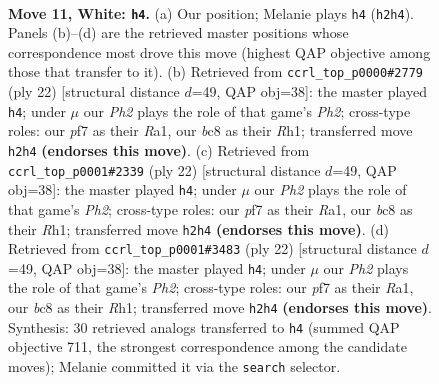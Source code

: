 \documentclass[11pt]{article}
\begin{document}
\clearpage

\begin{figure}[p]\centering
\begin{subfigure}{0.46\textwidth}\centering
\resizebox{\linewidth}{!}{%
\newchessgame
\chessboard[
  setfen={rnbqk2r/4bp2/2p2p2/pp1p3p/3P4/2N1P3/PP3PPP/R2QKBNR w KQkq - 0 11},
  showmover=false,
  pgfstyle=straightmove, color=movearrow, markmove={h2-h4}
]}
\caption{}
\end{subfigure}\hfill
\begin{subfigure}{0.46\textwidth}\centering
\resizebox{\linewidth}{!}{%
\newchessgame
\chessboard[
  setfen={r1bqk2r/5ppp/p1np4/1p1Np1b1/4P3/N1P5/PP3PPP/R2QKB1R w KQkq - 1 12},
  showmover=false,
  pgfstyle=straightmove, color=movearrow, markmove={h2-h4}
]}
\caption{}
\end{subfigure}
\\[4pt]
\begin{subfigure}{0.46\textwidth}\centering
\resizebox{\linewidth}{!}{%
\newchessgame
\chessboard[
  setfen={r1bqk2r/5ppp/p1np4/1p1Np1b1/4P3/N1P5/PP3PPP/R2QKB1R w KQkq - 1 12},
  showmover=false,
  pgfstyle=straightmove, color=movearrow, markmove={h2-h4}
]}
\caption{}
\end{subfigure}\hfill
\begin{subfigure}{0.46\textwidth}\centering
\resizebox{\linewidth}{!}{%
\newchessgame
\chessboard[
  setfen={r1bqk2r/5ppp/p1np4/1p1Np1b1/4P3/N1P5/PP3PPP/R2QKB1R w KQkq - 1 12},
  showmover=false,
  pgfstyle=straightmove, color=movearrow, markmove={h2-h4}
]}
\caption{}
\end{subfigure}
\caption{\textbf{Move 11, White: \texttt{h4}.} (a) Our position; Melanie plays \texttt{h4} (\texttt{h2h4}). Panels (b)--(d) are the retrieved master positions whose correspondence most drove this move (highest QAP objective among those that transfer to it). (b) Retrieved from \texttt{ccrl\_top\_p0000\#2779} (ply 22) [structural distance $d$=49, QAP obj=38]: the master played \texttt{h4}; under $\mu$ our \emph{Ph2} plays the role of that game's \emph{Ph2}; cross-type roles: our \emph{p}f7 as their \emph{R}a1, our \emph{b}c8 as their \emph{R}h1; transferred move \texttt{h2h4} \textbf{(endorses this move)}. (c) Retrieved from \texttt{ccrl\_top\_p0001\#2339} (ply 22) [structural distance $d$=49, QAP obj=38]: the master played \texttt{h4}; under $\mu$ our \emph{Ph2} plays the role of that game's \emph{Ph2}; cross-type roles: our \emph{p}f7 as their \emph{R}a1, our \emph{b}c8 as their \emph{R}h1; transferred move \texttt{h2h4} \textbf{(endorses this move)}. (d) Retrieved from \texttt{ccrl\_top\_p0001\#3483} (ply 22) [structural distance $d$=49, QAP obj=38]: the master played \texttt{h4}; under $\mu$ our \emph{Ph2} plays the role of that game's \emph{Ph2}; cross-type roles: our \emph{p}f7 as their \emph{R}a1, our \emph{b}c8 as their \emph{R}h1; transferred move \texttt{h2h4} \textbf{(endorses this move)}. Synthesis: 30 retrieved analogs transferred to \texttt{h4} (summed QAP objective 711, the strongest correspondence among the candidate moves); Melanie committed it via the \texttt{search} selector.}
\label{fig:thought-m20}
\end{figure}
\end{document}
